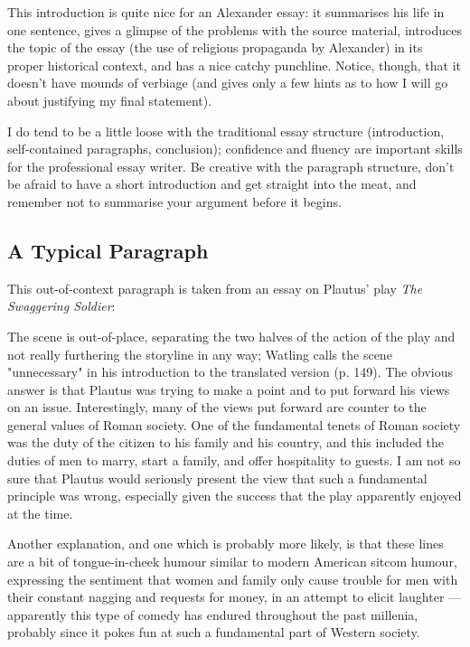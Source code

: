 \documentclass[a4paper,10pt]{article}
\begin{document}
This introduction is quite nice for an Alexander essay: it summarises his life in one sentence, gives a glimpse of the problems
with the source material, introduces the topic of the essay (the use of religious propaganda by Alexander) in its proper historical
context, and has a nice catchy punchline. Notice, though, that it doesn't have mounds of verbiage (and gives only a few hints as to
how I will go about justifying my final statement).

I do tend to be a little loose with the traditional essay structure (introduction, self-contained paragraphs, conclusion); confidence
and fluency are important skills for the professional essay writer. Be creative with the paragraph structure, don't be afraid to have
a short introduction and get straight into the meat, and remember not to summarise your argument before it begins.

\subsection{A Typical Paragraph}
This out-of-context paragraph is taken from an essay on Plautus' play \textit{The Swaggering Soldier}:
\begin{mdframed}
  The scene is out-of-place, separating the two halves of the action of the play and not really furthering the storyline
  in any way; Watling calls the scene "unnecessary" in his introduction to the translated version (p. 149). The obvious
  answer is that Plautus was trying to make a point and to put forward his views on an issue. Interestingly, many of the
  views put forward are counter to the general values of Roman society. One of the fundamental tenets of Roman society was
  the duty of the citizen to his family and his country, and this included the duties of men to marry, start a family, and
  offer hospitality to guests. I am not so sure that Plautus would seriously present the view that such a fundamental principle
  was wrong, especially given the success that the play apparently enjoyed at the time.

  Another explanation, and one which is probably more likely, is that these lines are a bit of tongue-in-cheek humour similar
  to modern American sitcom humour, expressing the sentiment that women and family only cause trouble for men with their constant
  nagging and requests for money, in an attempt to elicit laughter --- apparently this type of comedy has endured throughout the
  past millenia, probably since it pokes fun at such a fundamental part of Western society.
\end{mdframed}
\end{document}

